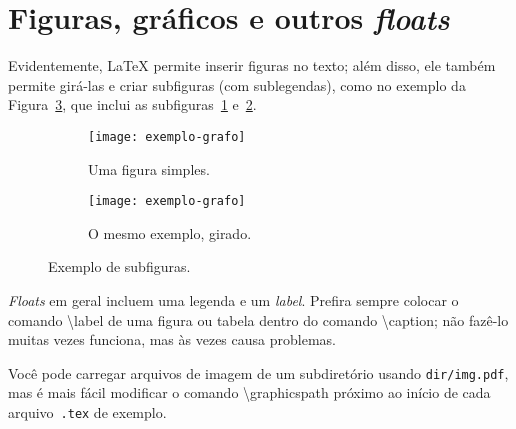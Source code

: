 \section{Figuras, gráficos e outros \emph{floats}}
\label{sec:exemplos-graficos}

Evidentemente, \LaTeX{} permite inserir figuras no texto; além disso, ele
também permite girá-las e criar subfiguras (com sublegendas),
como no exemplo da Figura~\ref{fig:subfigures}, que inclui
as subfiguras~\ref{fig:subfigures:a} e~\ref{fig:subfigures:b}.


\begin{figure}
  \centering

  \begin{subfigure}{0.4\textwidth}
    \centering
    \texttt{[image: exemplo-grafo]}
    \caption{Uma figura simples.\label{fig:subfigures:a}}
  \end{subfigure}
  \begin{subfigure}{0.4\textwidth}
    \centering
    \begin{turn}{90} %
      \texttt{[image: exemplo-grafo]}
    \end{turn}
    \caption{O mesmo exemplo, girado.\label{fig:subfigures:b}}
  \end{subfigure}

  \caption{Exemplo de subfiguras.\label{fig:subfigures}}
\end{figure}

\emph{Floats} em geral incluem uma legenda e um \emph{label}.
Prefira sempre colocar o comando \textsf{\textbackslash{}label} de uma
figura ou tabela dentro do comando \textsf{\textbackslash{}caption};
não fazê-lo muitas vezes funciona, mas às vezes causa problemas.

Você pode carregar arquivos de imagem de um subdiretório usando
\texttt{dir/img.pdf}, mas é mais fácil modificar o comando
\textsf{\textbackslash{}graphicspath} próximo ao início de cada
arquivo~\texttt{.tex} de exemplo.

